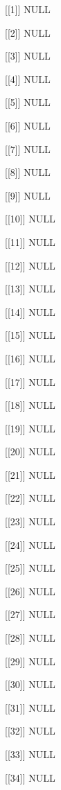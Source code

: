 \documentclass[
]{book}
\begin{document}
{[}{[}1{]}{]}
NULL

{[}{[}2{]}{]}
NULL

{[}{[}3{]}{]}
NULL

{[}{[}4{]}{]}
NULL

{[}{[}5{]}{]}
NULL

{[}{[}6{]}{]}
NULL

{[}{[}7{]}{]}
NULL

{[}{[}8{]}{]}
NULL

{[}{[}9{]}{]}
NULL

{[}{[}10{]}{]}
NULL

{[}{[}11{]}{]}
NULL

{[}{[}12{]}{]}
NULL

{[}{[}13{]}{]}
NULL

{[}{[}14{]}{]}
NULL

{[}{[}15{]}{]}
NULL

{[}{[}16{]}{]}
NULL

{[}{[}17{]}{]}
NULL

{[}{[}18{]}{]}
NULL

{[}{[}19{]}{]}
NULL

{[}{[}20{]}{]}
NULL

{[}{[}21{]}{]}
NULL

{[}{[}22{]}{]}
NULL

{[}{[}23{]}{]}
NULL

{[}{[}24{]}{]}
NULL

{[}{[}25{]}{]}
NULL

{[}{[}26{]}{]}
NULL

{[}{[}27{]}{]}
NULL

{[}{[}28{]}{]}
NULL

{[}{[}29{]}{]}
NULL

{[}{[}30{]}{]}
NULL

{[}{[}31{]}{]}
NULL

{[}{[}32{]}{]}
NULL

{[}{[}33{]}{]}
NULL

{[}{[}34{]}{]}
NULL

\printbibliography
\end{document}
